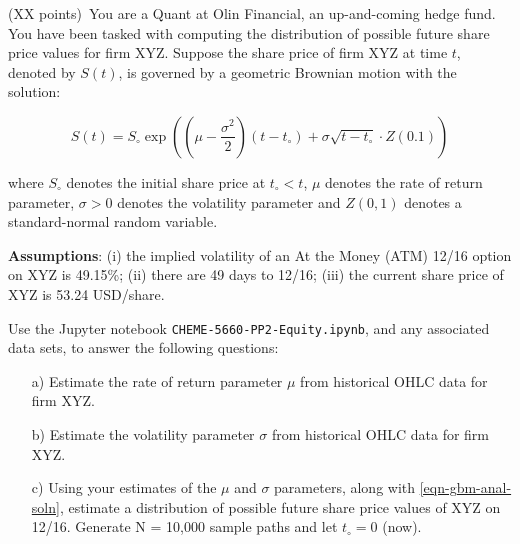 \item{(XX points)~You are a Quant at Olin Financial, an up-and-coming hedge fund. You have been tasked with computing the distribution of possible future share price values for firm XYZ.
Suppose the share price of firm XYZ at time $t$, denoted by $S(t)$, is governed by a geometric Brownian motion with the solution:

\begin{equation}\label{eqn-gbm-anal-soln}
S(t) = S_{\circ}\exp\left(\left(\mu - \frac{\sigma^{2}}{2}\right)\left(t-t_{\circ}\right)+\sigma\sqrt{t-t_{\circ}}\cdot{Z(0.1)}\right)
\end{equation}

where $S_{\circ}$ denotes the initial share price at $t_{\circ}<t$, $\mu$ denotes the rate of return parameter, 
$\sigma>0$ denotes the volatility parameter and $Z\left(0,1\right)$ denotes a standard-normal random variable. 

\textbf{Assumptions}: (i) the implied volatility of an At the Money (ATM) 12/16 option on XYZ is 49.15\%; 
(ii) there are 49 days to 12/16; (iii) the current share price of XYZ is 53.24 USD/share.

Use the Jupyter notebook \texttt{CHEME-5660-PP2-Equity.ipynb}, and any associated data sets, to answer the following questions:
\begin{itemize}
    \item[a)]{Estimate the rate of return parameter $\mu$ from historical OHLC data for firm XYZ.}
    \item[b)]{Estimate the volatility parameter $\sigma$ from historical OHLC data for firm XYZ.}
    \item[c)]{Using your estimates of the $\mu$ and $\sigma$ parameters, along with \eqref{eqn-gbm-anal-soln}, estimate a distribution of possible future share price values of XYZ on 12/16.
    Generate N = 10,000 sample paths and let $t_{\circ} = 0$ (now).}
\end{itemize}
}
